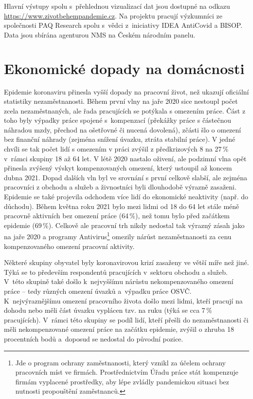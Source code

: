 Hlavní výstupy spolu s přehlednou vizualizací dat jsou dostupné na odkazu \url{https://www.zivotbehempandemie.cz}. Na projektu pracují výzkumníci ze společnosti PAQ Research spolu s vědci z iniciativy IDEA AntiCovid a BISOP. Data jsou sbírána agenturou NMS na Českém národním panelu.

\section*{Ekonomické dopady na domácnosti}
\label{Ekonomicke_dopady}

Epidemie koronaviru přinesla vyšší dopady na pracovní život, než ukazují oficiální statistiky nezaměstnanosti. Během první vlny na jaře 2020 sice nestoupl počet zcela nezaměstnaných, ale řada pracujících se potýkala s omezením práce. Část z toho byly výpadky práce spojené s kompenzací (překážky práce s částečnou náhradou mzdy, přechod na ošetřovné či nucená dovolená), zčásti šlo o omezení bez finanční náhrady (zejména snížení úvazku, ztráta stabilní práce). V jedné chvíli se tak počet lidí s omezením v práci zvýšil z předkrizových 8 na 27\,\% v rámci skupiny 18 až 64 let. V létě 2020 nastalo oživení, ale podzimní vlna opět přinesla zvýšený výskyt kompenzovaných omezení, který ustoupil až koncem dubna 2021. Dopad dalších vln byl ve srovnání s první celkově slabší, ale zejména pracovníci z obchodu a služeb a živnostníci byli dlouhodobě výrazně zasaženi. Epidemie se také projevila odchodem více lidí do ekonomické neaktivity (např. do důchodu). Během května roku 2021 bylo mezi lidmi od 18 do 64 let stále méně pracovně aktivních bez omezení práce (64\,\%), než tomu bylo před začátkem epidemie (69\,\%). Celkově ale pracovní trh nikdy nedostal tak výrazný zásah jako na jaře 2020 a programy Antivirus\footnote{Jde o program ochrany zaměstnanosti, který vznikl za účelem ochrany pracovních míst ve firmách. Prostřednictvím Úřadu práce stát kompenzuje firmám vyplacené prostředky, aby lépe zvládly pandemickou situaci bez nutnosti propouštění zaměstnanců.} omezily nárůst nezaměstnanosti za cenu kompenzovaného omezení pracovní aktivity.

Některé skupiny obyvatel byly koronavirovou krizí zasaženy ve větší míře než jiné. Týká se to především respondentů pracujících v sektoru obchodu a služeb. V této skupině také došlo k nejvyššímu nárůstu nekompenzovaného omezení práce – tedy různých omezení úvazků a výpadku práce OSVČ. K nejvýraznějšímu omezení pracovního života došlo mezi lidmi, kteří pracují na dohodu nebo měli část úvazku vyplácen tzv. na ruku (týká se cca 7\,\% pracujících). V rámci této skupiny se podíl lidí, kteří přešli do nezaměstnanosti či měli nekompenzované omezení práce na začátku epidemie, zvýšil o zhruba 18 procentních bodů a doposud se nedostal do původní pozice.

